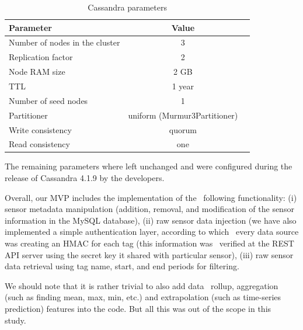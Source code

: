 \begin{table}[htp!]
  \caption{Cassandra parameters}
  \label{tab:params}
  \centering
  \begin{tabular}{lcc}
    \hline
    {\bf Parameter}                                  & {\bf Value } \\
    \hline
    Number of nodes in the cluster                   & 3       \\
    Replication factor                               & 2       \\
    Node RAM size                                    & 2 GB    \\
    TTL                                              & 1 year  \\
    Number of seed nodes                             & 1       \\
    Partitioner                                      & uniform (Murmur3Partitioner) \\
    Write consistency                                & quorum  \\
    Read consistency                                 & one     \\ 
  \end{tabular}
\end{table}

The remaining parameters where left unchanged and were configured
during the release of Cassandra 4.1.9 by the developers.

Overall, our MVP includes the implementation of the 
following functionality: (i) sensor metadata manipulation
(addition, removal, and modification of the sensor information
in the MySQL database), (ii) raw sensor data injection (we
have also implemented a simple authentication layer, according to which 
every data source was creating an HMAC for each tag (this information was 
verified at the REST API server using the secret key it shared
with particular sensor), (iii) raw sensor data
retrieval using tag name, start, and end periods for filtering.

We should note that it is rather trivial to also add data 
rollup, aggregation (such as finding mean, max, min, etc.)
and extrapolation (such as time-series prediction) features
into the code. But all this was out of the scope in this 
study. 

